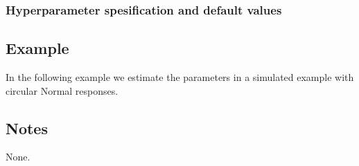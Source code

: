 \documentclass[a4paper,11pt]{article}
\begin{document}
\subsubsection*{Hyperparameter spesification and default values}


\subsection*{Example}

In the following example we estimate the parameters in a simulated
example with circular Normal responses.


\subsection*{Notes}

None.
\end{document}
